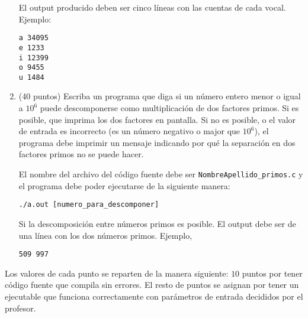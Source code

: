 \documentclass{article}
\begin{document}
\begin{enumerate}
El output producido deben ser cinco l\'ineas con las cuentas de cada vocal. Ejemplo:

\begin{verbatim}
a 34095
e 1233
i 12399
o 9455
u 1484
\end{verbatim}

\item (40 puntos) Escriba un programa que diga si un n\'umero entero menor o igual a $10^6$ puede descomponerse como multiplicaci\'on de dos factores primos. Si es posible, que imprima los dos factores en pantalla. Si no es posible, o el valor de entrada es incorrecto (es un n\'umero negativo o major que $10^6$), el programa debe imprimir un mensaje indicando por qu\'e la separaci\'on en dos factores primos no se puede hacer.


El nombre del archivo del c\'odigo fuente debe ser \verb"NombreApellido_primos.c" y el programa debe poder ejecutarse de la siguiente manera:

\begin{verbatim}
./a.out [numero_para_descomponer]
\end{verbatim}

Si la descomposici\'on entre n\'umeros primos es posible. El output debe ser de una l\'inea con los dos n\'umeros primos. Ejemplo,

\begin{verbatim}
509 997
\end{verbatim}

\end{enumerate}

Los valores de cada punto se reparten de la manera siguiente: $10$ puntos por tener c\'odigo fuente que compila sin errores. El resto de puntos se asignan por tener un ejecutable que funciona correctamente con par\'ametros de entrada decididos por el profesor.
\end{document}
